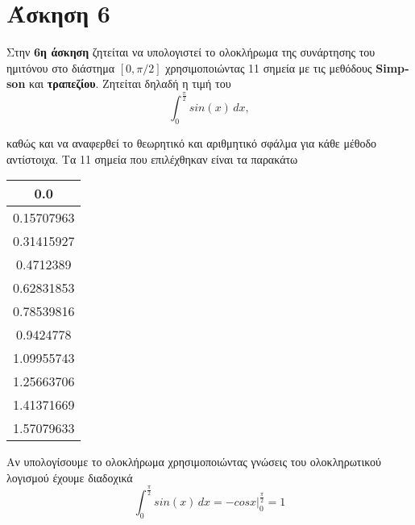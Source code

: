 \documentclass[Second Project.tex]{subfiles}
\begin{document}
\section{ Άσκηση 6 }
Στην \textbf{6η άσκηση} ζητείται να υπολογιστεί το ολοκλήρωμα της συνάρτησης του ημιτόνου στο 
διάστημα $[0,\pi/2]$ χρησιμοποιώντας 11 σημεία με τις μεθόδους \textlatin{\textbf{Simpson}} και
\textbf{τραπεζίου}. Ζητείται δηλαδή η τιμή του 
\begin{equation*}
    \int_{0}^{\frac{\pi}{2}} sin(x) \,dx ,
\end{equation*}

καθώς και να αναφερθεί το θεωρητικό και αριθμητικό σφάλμα για κάθε μέθοδο αντίστοιχα. Τα 11 σημεία που
επιλέχθηκαν είναι τα παρακάτω
\begin{center}
    \begin{tabular}{ |c| } 
     \hline
     0.0 \\
     \hline
     0.15707963 \\
     \hline
     0.31415927 \\ 
     \hline
     0.4712389 \\
     \hline
     0.62831853 \\
     \hline
     0.78539816 \\
     \hline
     0.9424778 \\
     \hline
     1.09955743 \\
     \hline
     1.25663706 \\
     \hline
     1.41371669 \\
     \hline
     1.57079633 \\
     \hline
    \end{tabular}
\end{center}

Αν υπολογίσουμε το ολοκλήρωμα χρησιμοποιώντας γνώσεις του ολοκληρωτικού λογισμού έχουμε διαδοχικά
\begin{equation*}
    \int_{0}^{\frac{\pi}{2}} sin(x) \,dx = -cosx \Big|_0^\frac{\pi}{2} = 1
\end{equation*}
\end{document}
